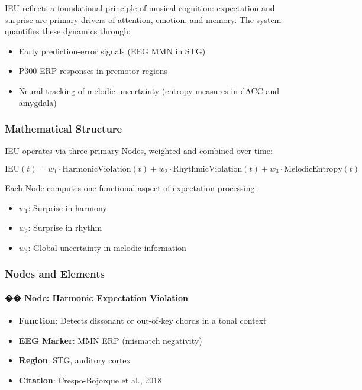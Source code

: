 IEU reflects a foundational principle of musical cognition: expectation and surprise are primary drivers of attention, emotion, and memory. The system quantifies these dynamics through:

\begin{itemize}
    \item Early prediction-error signals (EEG MMN in STG)
    \item P300 ERP responses in premotor regions
    \item Neural tracking of melodic uncertainty (entropy measures in dACC and amygdala)
\end{itemize}

\subsubsection*{Mathematical Structure}

IEU operates via three primary Nodes, weighted and combined over time:

\[
\text{IEU}(t) = w_1 \cdot \text{HarmonicViolation}(t) + w_2 \cdot \text{RhythmicViolation}(t) + w_3 \cdot \text{MelodicEntropy}(t)
\]

Each Node computes one functional aspect of expectation processing:

\begin{itemize}
    \item $w_1$: Surprise in harmony
    \item $w_2$: Surprise in rhythm
    \item $w_3$: Global uncertainty in melodic information
\end{itemize}

\subsubsection*{Nodes and Elements}

\paragraph{�� Node: Harmonic Expectation Violation}

\begin{itemize}
    \item \textbf{Function}: Detects dissonant or out-of-key chords in a tonal context
    \item \textbf{EEG Marker}: MMN ERP (mismatch negativity)
    \item \textbf{Region}: STG, auditory cortex
    \item \textbf{Citation}: Crespo-Bojorque et al., 2018
\end{itemize}

